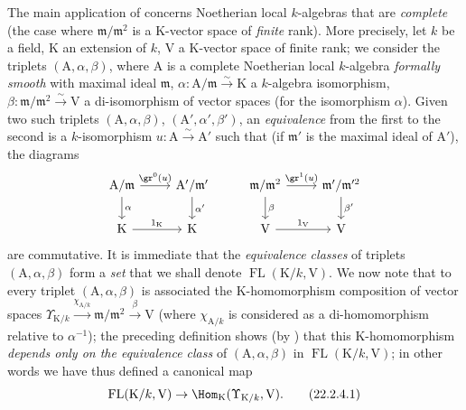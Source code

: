 \begin{env}[22.2.4]
\label{0.22.2.4}
The main application of  concerns Noetherian local $k$-algebras that are \emph{complete} (the case where $\mathfrak{m}/\mathfrak{m}^2$ is a $\mathrm{K}$-vector space of \emph{finite} rank).
More precisely, let $k$ be a field, $\mathrm{K}$ an extension of $k$, $\mathrm{V}$ a $\mathrm{K}$-vector space of
finite rank; we consider the triplets $(\mathrm{A},\alpha,\beta)$, where $\mathrm{A}$ is a complete Noetherian local $k$-algebra \emph{formally smooth} with maximal ideal $\mathfrak{m}$, $\alpha:\mathrm{A}/\mathfrak{m}\xrightarrow{\sim}\mathrm{K}$ a $k$-algebra isomorphism, $\beta:\mathfrak{m}/\mathfrak{m}^2\xrightarrow{\sim}\mathrm{V}$ a di-isomorphism of vector spaces (for the isomorphism $\alpha$).
Given two such triplets $(\mathrm{A},\alpha,\beta)$, $(\mathrm{A}',\alpha',\beta')$, an \emph{equivalence} from the first to the second is a $k$-isomorphism $u:\mathrm{A}\xrightarrow{\sim}\mathrm{A}'$ such that (if $\mathfrak{m}'$ is the maximal ideal of $\mathrm{A}'$), the diagrams
\[
  \begin{tikzcd}
    \mathrm{A}/\mathfrak{m} \ar[r,"\gr^0(u)"] \ar[d,"\alpha"] & \mathrm{A}'/\mathfrak{m}' \ar[d,"\alpha'"] & \mathfrak{m}/\mathfrak{m}^2 \ar[r,"\gr^1(u)"] \ar[d,"\beta"] & \mathfrak{m}'/\mathfrak{m}'^2 \ar[d,"\beta'"]\\
    \mathrm{K} \ar[r,"1_\mathrm{K}"] & \mathrm{K} & \mathrm{V} \ar[r,"1_\mathrm{V}"] & \mathrm{V}
  \end{tikzcd}
\]
are commutative.
It is immediate that the \emph{equivalence classes} of triplets $(\mathrm{A},\alpha,\beta)$ form a \emph{set} that we shall denote $\operatorname{FL}(\mathrm{K}/k,\mathrm{V})$.
We now note that to every triplet $(\mathrm{A},\alpha,\beta)$ is associated the $\mathrm{K}$-homomorphism composition of vector spaces $\Upsilon_{\mathrm{K}/k}\xrightarrow{\chi_{\mathrm{A}/k}}\mathfrak{m}/\mathfrak{m}^2\xrightarrow{\beta}\mathrm{V}$ (where $\chi_{\mathrm{A}/k}$ is considered as a di-homomorphism relative to $\alpha^{-1}$); the preceding definition shows (by ) that this $\mathrm{K}$-homomorphism \emph{depends only on the equivalence class} of $(\mathrm{A},\alpha,\beta)$ in $\operatorname{FL}(\mathrm{K}/k,\mathrm{V})$; in other words we have thus defined a canonical map
\[
\label{0.22.2.4.1}
  \operatorname{FL}(\mathrm{K}/k,\mathrm{V})\to\Hom_\mathrm{K}(\Upsilon_{\mathrm{K}/k},\mathrm{V}).
  \tag{22.2.4.1}
\]
\end{env}

